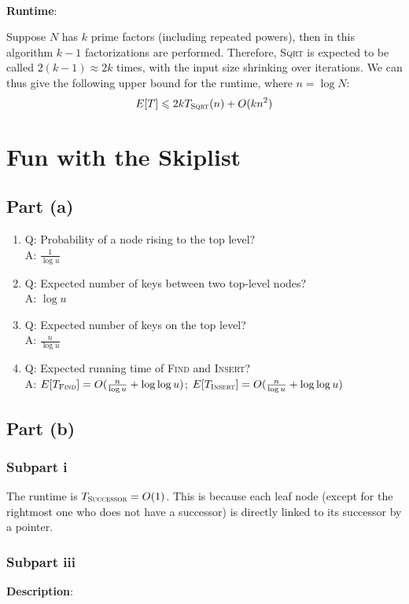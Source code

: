 \documentclass{article}
\begin{document}
~

\noindent\textbf{Runtime}:

Suppose $N$ has $k$ prime factors (including repeated powers), then in this algorithm $k-1$ factorizations are performed. Therefore, \textsc{Sqrt} is expected to be called $2(k-1)\approx2k$ times, with the input size shrinking over iterations. We can thus give the following upper bound for the runtime, where $n=\log N$:
\begin{equation*}
E[T]\leqslant2kT_{\textsc{Sqrt}}(n)+O(kn^2)
\end{equation*}

\section{Fun with the Skiplist}
\subsection{Part (a)}
\begin{enumerate}
\item{Q: Probability of a node rising to the top level?\\A: $\frac{1}{\log u}$}
\item{Q: Expected number of keys between two top-level nodes?\\A: $\log u$}
\item{Q: Expected number of keys on the top level?\\A: $\frac{n}{\log u}$}
\item{Q: Expected running time of \textsc{Find} and \textsc{Insert}?\\A: $E[T_{\textsc{Find}}]=O(\frac{n}{\log u}+\log\log u)$; $E[T_{\textsc{Insert}}]=O(\frac{n}{\log u}+\log\log u)$}
\end{enumerate}

\subsection{Part (b)}
\subsubsection{Subpart i}
The runtime is $T_{\textsc{Successor}}=O(1)$. This is because each leaf node (except for the rightmost one who does not have a successor) is directly linked to its successor by a pointer.

\subsubsection{Subpart iii}
\noindent\textbf{Description}:
\end{document}
